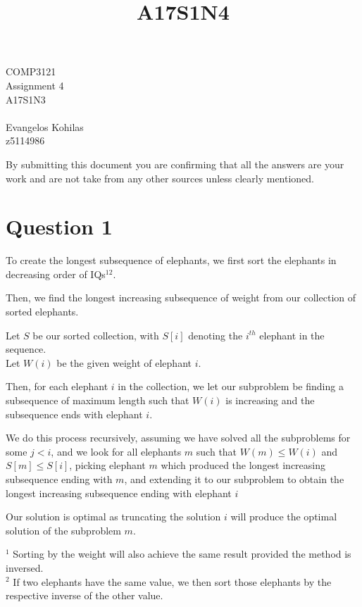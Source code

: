 \documentclass{article}
\title{A17S1N4}
\begin{document}
\begin{center}
    \begin{LARGE}
        COMP3121\\
        Assignment 4\\
        A17S1N3\\
        \hrulefill\\
        Evangelos Kohilas\\
        z5114986\\
        \hrulefill
    \end{LARGE}

    \begin{large}
        By submitting this document you are confirming that all the answers are your work and are not take from any other sources unless clearly mentioned.
    \end{large}

\end{center}

\section*{Question 1}
To create the longest subsequence of elephants, we first sort the elephants in decreasing order of IQs$^{12}$.

Then, we find the longest increasing subsequence of weight from our collection of sorted elephants.

Let $S$ be our sorted collection, with $S[i]$ denoting the $i^{th}$ elephant in the sequence.\\
Let $W(i)$ be the given weight of elephant $i$.

Then, for each elephant $i$ in the collection, we let our subproblem be finding a subsequence of maximum length such that $W(i)$ is increasing and the subsequence ends with elephant $i$.

We do this process recursively, assuming we have solved all the subproblems for some $j < i$, and we look for all elephants $m$ such that $W(m) \leq W(i)$ and $S[m] \leq S[i]$, picking elephant $m$ which produced the longest increasing subsequence ending with $m$, and extending it to our subproblem to obtain the longest increasing subsequence ending with elephant $i$

Our solution is optimal as truncating the solution $i$ will produce the optimal solution of the subproblem $m$.

$^1$ Sorting by the weight will also achieve the same result provided the method is inversed.\\
$^2$ If two elephants have the same value, we then sort those elephants by the respective inverse of the other value.
\end{document}
